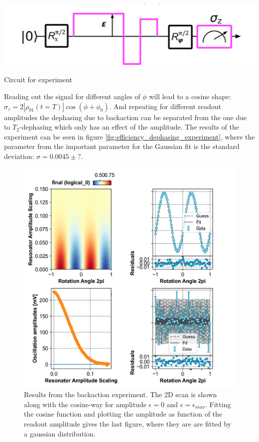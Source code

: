 \begin{marginfigure}
    \centering
    \includegraphics{Figs/calibrations/efficiency/experiment_circuit_dephasing.png}
    \caption{Circuit for experiment}
    \label{fig:efficiency_dephasing_experiment}
\end{marginfigure}

Reading out the signal for different angles of $\phi$ will lead to a cosine shape: $\sigma_z = 2 |\rho_{01}(t= T)| \cos(\phi+\phi_0)$. And repeating for different readout amplitudes the dephasing due to backaction can be separated from the one due to $T_2$-dephasing which only has an effect of the amplitude. The results of the experiment can be seen in figure \ref{fig:efficiency_dephasing_experiment}, where the parameter from the important parameter for the Gaussian fit is the standard deviation: $\sigma = 0.0045 \pm ?$. 

\begin{figure}
    \centering
    \includegraphics{Figs/calibrations/efficiency/dephasing_result.png}
    \caption{Results from the backaction experiment. The 2D scan is shown along with the cosine-way for amplitude $\epsilon = 0$ and $\epsilon = \epsilon_{max}$. Fitting the cosine function and plotting the amplitude as function of the readout amplitude gives the last figure, where they are are fitted by a gaussian distribution.}
    \label{fig:efficiency_dephasing_result}
\end{figure}

